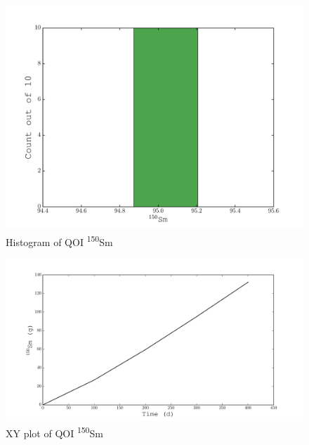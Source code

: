 \documentclass[11pt,notitlepage]{article}
\newcommand{\tss}{\textsuperscript}
\begin{document}
  \begin{figure}[H]
    \begin{center}
      \includegraphics[width=0.77\columnwidth]{../Origen2/PLOTS/SM150Post_HIST.pdf}
      \vspace{-5mm}
      \caption{Histogram of QOI \tss{150}Sm}
      \label{fig:POSTHISTSm150}
    \end{center}
  \end{figure}

    \begin{figure}[H]
    \begin{center}
      \includegraphics[width=0.77\columnwidth]{../Origen2/PLOTS/SM150Post_XY.pdf}
      \vspace{-5mm}
      \caption{XY plot of QOI \tss{150}Sm}
      \label{fig:POSTXYSm150}
    \end{center}
  \end{figure}
\end{document}
